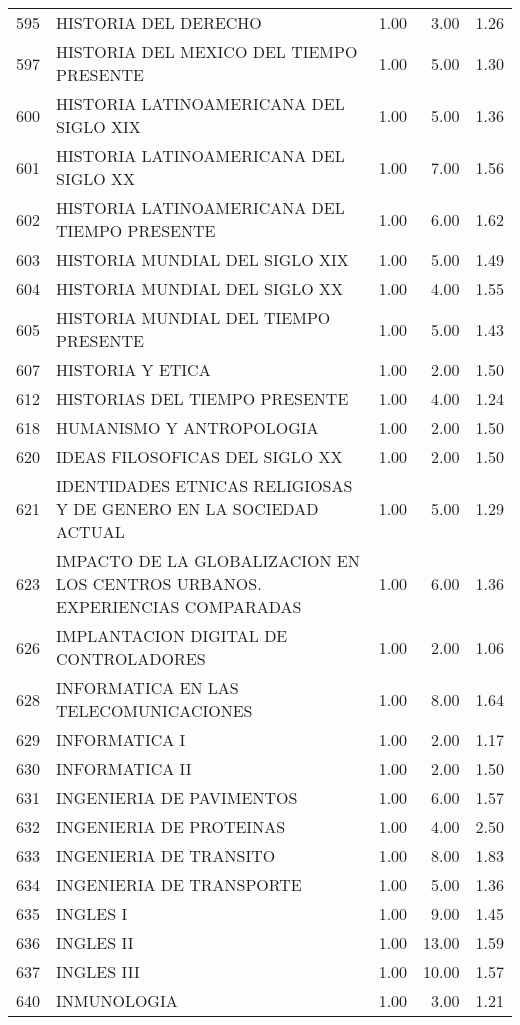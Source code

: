 \begin{table}[ht]
\begin{tabular}{rlrrr}
  595 & HISTORIA DEL DERECHO & 1.00 & 3.00 & 1.26 \\ 
  597 & HISTORIA DEL MEXICO DEL TIEMPO PRESENTE & 1.00 & 5.00 & 1.30 \\ 
  600 & HISTORIA LATINOAMERICANA DEL SIGLO XIX & 1.00 & 5.00 & 1.36 \\ 
  601 & HISTORIA LATINOAMERICANA DEL SIGLO XX & 1.00 & 7.00 & 1.56 \\ 
  602 & HISTORIA LATINOAMERICANA DEL TIEMPO PRESENTE & 1.00 & 6.00 & 1.62 \\ 
  603 & HISTORIA MUNDIAL DEL SIGLO XIX & 1.00 & 5.00 & 1.49 \\ 
  604 & HISTORIA MUNDIAL DEL SIGLO XX & 1.00 & 4.00 & 1.55 \\ 
  605 & HISTORIA MUNDIAL DEL TIEMPO PRESENTE & 1.00 & 5.00 & 1.43 \\ 
  607 & HISTORIA Y ETICA & 1.00 & 2.00 & 1.50 \\ 
  612 & HISTORIAS DEL TIEMPO PRESENTE & 1.00 & 4.00 & 1.24 \\ 
  618 & HUMANISMO Y ANTROPOLOGIA & 1.00 & 2.00 & 1.50 \\ 
  620 & IDEAS FILOSOFICAS DEL SIGLO XX & 1.00 & 2.00 & 1.50 \\ 
  621 & IDENTIDADES ETNICAS RELIGIOSAS Y DE GENERO EN LA SOCIEDAD ACTUAL & 1.00 & 5.00 & 1.29 \\ 
  623 & IMPACTO DE LA GLOBALIZACION EN LOS CENTROS URBANOS. EXPERIENCIAS COMPARADAS & 1.00 & 6.00 & 1.36 \\ 
  626 & IMPLANTACION DIGITAL DE CONTROLADORES & 1.00 & 2.00 & 1.06 \\ 
  628 & INFORMATICA EN LAS TELECOMUNICACIONES & 1.00 & 8.00 & 1.64 \\ 
  629 & INFORMATICA I & 1.00 & 2.00 & 1.17 \\ 
  630 & INFORMATICA II & 1.00 & 2.00 & 1.50 \\ 
  631 & INGENIERIA DE PAVIMENTOS & 1.00 & 6.00 & 1.57 \\ 
  632 & INGENIERIA DE PROTEINAS & 1.00 & 4.00 & 2.50 \\ 
  633 & INGENIERIA DE TRANSITO & 1.00 & 8.00 & 1.83 \\ 
  634 & INGENIERIA DE TRANSPORTE & 1.00 & 5.00 & 1.36 \\ 
  635 & INGLES I & 1.00 & 9.00 & 1.45 \\ 
  636 & INGLES II & 1.00 & 13.00 & 1.59 \\ 
  637 & INGLES III & 1.00 & 10.00 & 1.57 \\ 
  640 & INMUNOLOGIA & 1.00 & 3.00 & 1.21 \\ 

\end{tabular}
\end{table}
